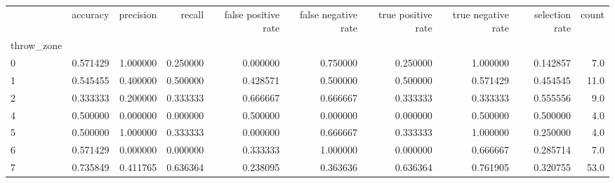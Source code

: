 \begin{tabular}{lrrrrrrrrr}
\toprule
{} &  accuracy &  precision &    recall &  false positive rate &  false negative rate &  true positive rate &  true negative rate &  selection rate &  count \\
throw\_zone &           &            &           &                      &                      &                     &                     &                 &        \\
\midrule
0          &  0.571429 &   1.000000 &  0.250000 &             0.000000 &             0.750000 &            0.250000 &            1.000000 &        0.142857 &    7.0 \\
1          &  0.545455 &   0.400000 &  0.500000 &             0.428571 &             0.500000 &            0.500000 &            0.571429 &        0.454545 &   11.0 \\
2          &  0.333333 &   0.200000 &  0.333333 &             0.666667 &             0.666667 &            0.333333 &            0.333333 &        0.555556 &    9.0 \\
4          &  0.500000 &   0.000000 &  0.000000 &             0.500000 &             0.000000 &            0.000000 &            0.500000 &        0.500000 &    4.0 \\
5          &  0.500000 &   1.000000 &  0.333333 &             0.000000 &             0.666667 &            0.333333 &            1.000000 &        0.250000 &    4.0 \\
6          &  0.571429 &   0.000000 &  0.000000 &             0.333333 &             1.000000 &            0.000000 &            0.666667 &        0.285714 &    7.0 \\
7          &  0.735849 &   0.411765 &  0.636364 &             0.238095 &             0.363636 &            0.636364 &            0.761905 &        0.320755 &   53.0 \\
\bottomrule
\end{tabular}
